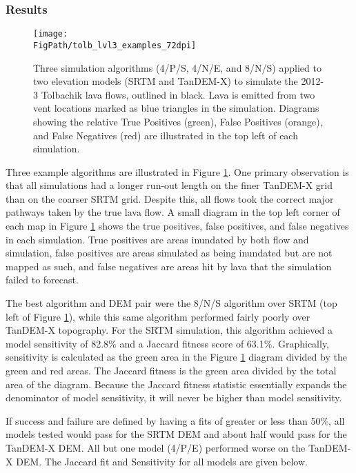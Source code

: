 	\subsubsection{Results}
	
	\begin{figure}[!h]
			\centering
			\texttt{[image: \\FigPath/tolb\_lvl3\_examples\_72dpi]}
			\caption[Three transition function algorithms simulating the 2012-3 Tolbachik lava flows]{Three simulation algorithms (4/P/S, 4/N/E, and 8/N/S) applied to two elevation models (SRTM and TanDEM-X) to simulate the 2012-3 Tolbachik lava flows, outlined in black. Lava is emitted from two vent locations marked as blue triangles in the simulation. Diagrams showing the relative True Positives (green), False Positives (orange), and False Negatives (red) are illustrated in the top left of each simulation.}
			\label{fig:tolbachik}
		\end{figure}
	
	Three example algorithms are illustrated in Figure \ref{fig:tolbachik}. One primary observation is that all simulations had a longer run-out length on the finer TanDEM-X grid than on the coarser SRTM grid. Despite this, all flows took the correct major pathways taken by the true lava flow. A small diagram in the top left corner of each map in Figure \ref{fig:tolbachik} shows the true positives, false positives, and false negatives in each simulation. True positives are areas inundated by both flow and simulation, false positives are areas simulated as being inundated but are not mapped as such, and false negatives are areas hit by lava that the simulation failed to forecast. 
		
			The best algorithm and DEM pair were the 8/N/S algorithm over SRTM (top left of Figure \ref{fig:tolbachik}), while this same algorithm performed fairly poorly over TanDEM-X topography. For the SRTM simulation, this algorithm achieved a model sensitivity of 82.8\% and a Jaccard fitness score of 63.1\%. Graphically, sensitivity is calculated as the green area in the Figure \ref{fig:tolbachik} diagram divided by the green and red areas. The Jaccard fitness is the green area divided by the total area of the diagram. Because the Jaccard fitness statistic essentially expands the denominator of model sensitivity, it will never be higher than model sensitivity.
			
			If success and failure are defined by having a fits of greater or less than 50\%, all models tested would pass for the SRTM DEM and about half would pass for the TanDEM-X DEM. All but one model (4/P/E) performed worse on the TanDEM-X DEM. The Jaccard fit and Sensitivity for all models are given below.
					
